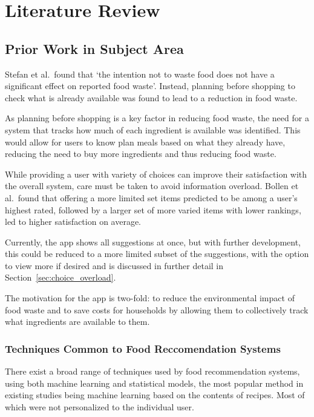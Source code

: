 \section{Literature Review}

\subsection{Prior Work in Subject Area}
Stefan et al.\ found that \enquote*{the intention not to waste food does not have a
significant effect on reported food waste}. Instead, planning before shopping to
check what is already available was found to lead to a reduction in food waste.~\cite{stefan_avoiding_2013}

As planning before shopping is a key factor in reducing food waste, the need for a system
that tracks how much of each ingredient is available was identified. This would allow for
users to know plan meals based on what they already have, reducing the need to buy more ingredients
and thus reducing food waste.

\label{sec:overload_intro}While providing a user with variety of choices can improve their satisfaction
with the overall system, care must be taken to avoid information overload.
Bollen et al.\ found that offering a more limited set items predicted to be among a user's
highest rated, followed by a larger set of more varied items with lower rankings, led to
higher satisfaction on average.~\cite{bollen_understanding_2010}

Currently, the app shows all suggestions at once, but with further development, this could be
reduced to a more limited subset of the suggestions, with the option to view more if desired and is
discussed in further detail in Section~\ref{sec:choice_overload}.

The motivation for the \chef{} app is two-fold: to reduce the environmental impact of food waste and to
save costs for households by allowing them to collectively track what ingredients are available to them.

\subsubsection{Techniques Common to Food Reccomendation Systems}
There exist a broad range of techniques used by food recommendation systems, using both machine learning
and statistical models, the most popular method in existing studies being machine learning based on the
contents of recipes. Most of which were not personalized to the individual user.~\cite{bondevik_systematic_2024}

